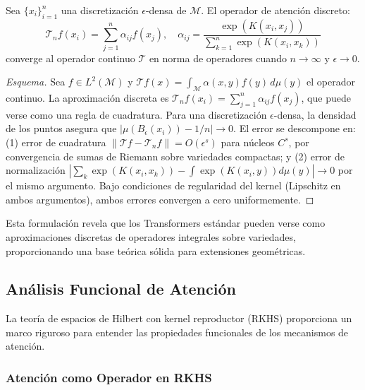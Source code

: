 \begin{theorem}\label{theorem:finite_attention_approximation}
    Sea $\{x_i\}_{i=1}^n$ una discretización $\epsilon$-densa de $\mathcal{M}$. El operador de atención discreto:
    \begin{equation}
        \mathcal{T}_n f(x_i) = \sum_{j=1}^n \alpha_{ij} f(x_j), \quad \alpha_{ij} = \frac{\exp(K(x_i, x_j))}{\sum_{k=1}^n \exp(K(x_i, x_k))}
    \end{equation}
    converge al operador continuo $\mathcal{T}$ en norma de operadores cuando $n \to \infty$ y $\epsilon \to 0$.
\end{theorem}

\begin{proof}[Esquema]
Sea $f \in L^2(\mathcal{M})$ y $\mathcal{T}f(x) = \int_{\mathcal{M}} \alpha(x,y) f(y) \, d\mu(y)$ el operador continuo. La aproximación discreta es $\mathcal{T}_n f(x_i) = \sum_{j=1}^n \alpha_{ij} f(x_j)$, que puede verse como una regla de cuadratura. Para una discretización $\epsilon$-densa, la densidad de los puntos asegura que $|\mu(B_\epsilon(x_i)) - 1/n| \to 0$. El error se descompone en: (1) error de cuadratura $\|\mathcal{T}f - \mathcal{T}_n f\| = O(\epsilon^s)$ para núcleos $C^s$, por convergencia de sumas de Riemann sobre variedades compactas; y (2) error de normalización $|\sum_k \exp(K(x_i,x_k)) - \int \exp(K(x_i,y)) d\mu(y)| \to 0$ por el mismo argumento. Bajo condiciones de regularidad del kernel (Lipschitz en ambos argumentos), ambos errores convergen a cero uniformemente.
\end{proof}

Esta formulación revela que los \glspl{Transformer} estándar pueden verse como aproximaciones discretas de operadores integrales sobre variedades, proporcionando una base teórica sólida para extensiones geométricas.

\subsection{Análisis Funcional de Atención}\label{subsec:functional_analysis_attention}

La teoría de espacios de Hilbert con kernel reproductor (RKHS) proporciona un marco riguroso para entender las propiedades funcionales de los mecanismos de atención.

\subsubsection{Atención como Operador en RKHS}

